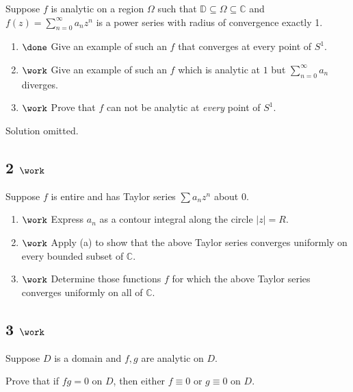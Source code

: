Suppose \(f\) is analytic on a region \(\Omega\) such that
\({\mathbb{D}}\subseteq \Omega \subseteq {\mathbb{C}}\) and
\(f(z) = \sum_{n=0}^\infty a_n z^n\) is a power series with radius of
convergence exactly 1.

\begin{enumerate}
\def\labelenumi{\alph{enumi}.}
\item
  \(\done\) Give an example of such an \(f\) that converges at every
  point of \(S^1\).
\item
  \(\work\) Give an example of such an \(f\) which is analytic at \(1\)
  but \(\sum_{n=0}^\infty a_n\) diverges.
\item
  \(\work\) Prove that \(f\) can not be analytic at \emph{every} point
  of \(S^1\).
\end{enumerate}


Solution omitted.

\hypertarget{work-23}{%
\subsection{\texorpdfstring{2
\(\work\)}{2 \textbackslash work}}\label{work-23}}

Suppose \(f\) is entire and has Taylor series \(\sum a_n z^n\) about 0.

\begin{enumerate}
\def\labelenumi{\alph{enumi}.}
\item
  \(\work\) Express \(a_n\) as a contour integral along the circle
  \({\left\lvert {z} \right\rvert} = R\).
\item
  \(\work\) Apply (a) to show that the above Taylor series converges
  uniformly on every bounded subset of \({\mathbb{C}}\).
\item
  \(\work\) Determine those functions \(f\) for which the above Taylor
  series converges uniformly on all of \({\mathbb{C}}\).
\end{enumerate}

\hypertarget{work-24}{%
\subsection{\texorpdfstring{3
\(\work\)}{3 \textbackslash work}}\label{work-24}}

Suppose \(D\) is a domain and \(f, g\) are analytic on \(D\).

Prove that if \(fg = 0\) on \(D\), then either \(f \equiv 0\) or
\(g\equiv 0\) on \(D\).

